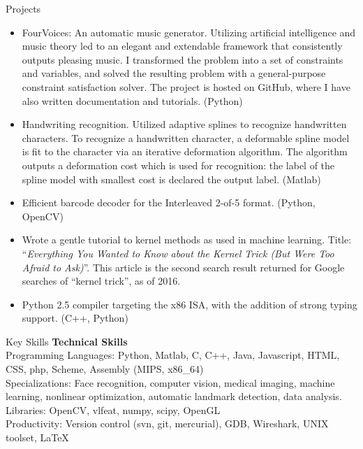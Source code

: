\documentclass{resume}
\begin{document}
\vspace{0.5em}

\begin{component}{Projects}
	\begin{itemize}
		\vspace{-0.5em}\item FourVoices: An automatic music generator. Utilizing artificial intelligence and music theory led to an elegant and extendable framework that consistently outputs pleasing music.
I transformed the problem into a set of constraints and variables, and solved the resulting problem with a general-purpose constraint satisfaction solver.
The project is hosted on GitHub, where I have also written documentation and tutorials.
		(Python)
        \vspace{-0.5em}\item Handwriting recognition. Utilized adaptive splines to recognize handwritten characters.
To recognize a handwritten character, a deformable spline model is fit to the character via an iterative deformation algorithm.
The algorithm outputs a deformation cost which is used for recognition: the label of the spline model with smallest cost is declared the output label.
(Matlab)
        \vspace{-0.5em}\item Efficient barcode decoder
	        for the Interleaved 2-of-5 format. (Python, OpenCV)
        \vspace{-0.5em}\item Wrote a gentle tutorial to kernel methods as used in machine learning. Title: ``\emph{Everything You Wanted to Know about the Kernel Trick (But Were Too Afraid to Ask)}''. This article is the second search result returned for Google searches of ``kernel trick'', as of 2016.
		\vspace{-0.5em}\item Python 2.5 compiler targeting the x86 ISA, with the addition of
		strong typing support. (C++, Python)
	\end{itemize}
\end{component}

\vspace{-1.0em}

\begin{component}{Key Skills}
	\textbf{Technical Skills}\\
		Programming Languages: Python, Matlab, C, C++, Java, Javascript, HTML, CSS, php, Scheme, Assembly (MIPS, x86\_64)\\
        Specializations: Face recognition, computer vision, medical imaging, machine learning, nonlinear optimization, automatic landmark detection, data analysis.\\
		Libraries: OpenCV, vlfeat, numpy, scipy, OpenGL \\
		Productivity: Version control (svn, git, mercurial), GDB, Wireshark, UNIX toolset, LaTeX
\end{component}
\end{document}
